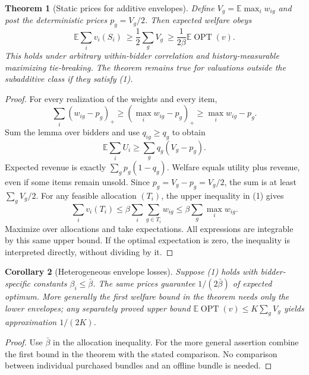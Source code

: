 \documentclass[11pt,a4paper]{article}
\newtheorem{theorem}{Theorem}
\newtheorem{corollary}[theorem]{Corollary}
\newcommand{\E}{\mathbb E}
\newcommand{\OPT}{\operatorname{OPT}}
\begin{document}
\begin{theorem}[Static prices for additive envelopes]
Define $V_g=\E\max_i w_{ig}$ and post the deterministic prices $p_g=V_g/2$. Then expected welfare obeys
\[
 \E\sum_i v_i(S_i)\ \geq\frac12\sum_g V_g
 \ \geq\frac1{2\beta}\E\OPT(v).
\]
This holds under arbitrary within-bidder correlation and history-measurable maximizing tie-breaking. The theorem remains true for valuations outside the subadditive class if they satisfy (1).
\end{theorem}
\begin{proof}
For every realization of the weights and every item,
\[
 \sum_i(w_{ig}-p_g)_+\geq(\max_i w_{ig}-p_g)_+
 \geq\max_i w_{ig}-p_g.
\]
Sum the lemma over bidders and use $q_{ig}\geq q_g$ to obtain
\[
 \E\sum_iU_i\geq\sum_g q_g(V_g-p_g).
\]
Expected revenue is exactly $\sum_g p_g(1-q_g)$. Welfare equals utility plus revenue, even if some items remain unsold. Since $p_g=V_g-p_g=V_g/2$, the sum is at least $\sum_g V_g/2$.
For any feasible allocation $(T_i)$, the upper inequality in (1) gives
\[
 \sum_i v_i(T_i)\leq\beta\sum_i\sum_{g\in T_i}w_{ig}
 \leq\beta\sum_g\max_iw_{ig}.
\]
Maximize over allocations and take expectations. All expressions are integrable by this same upper bound. If the optimal expectation is zero, the inequality is interpreted directly, without dividing by it.
\end{proof}

\begin{corollary}[Heterogeneous envelope losses]
Suppose (1) holds with bidder-specific constants $\beta_i\leq\bar\beta$. The same prices guarantee $1/(2\bar\beta)$ of expected optimum. More generally the first welfare bound in the theorem needs only the lower envelopes; any separately proved upper bound $\E\OPT(v)\leq K\sum_gV_g$ yields approximation $1/(2K)$.
\end{corollary}
\begin{proof}
Use $\bar\beta$ in the allocation inequality. For the more general assertion combine the first bound in the theorem with the stated comparison. No comparison between individual purchased bundles and an offline bundle is needed.
\end{proof}
\end{document}
